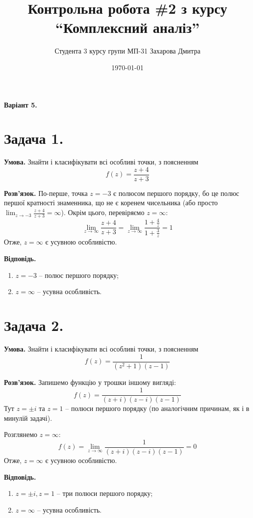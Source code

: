 \documentclass[14pt]{extarticle}
\title{Контрольна робота \#2 з курсу ``Комплексний аналіз''}
\author{Студента 3 курсу групи МП-31 Захарова Дмитра}
\date{\today}
\begin{document}
\maketitle

\begin{center}
    \textbf{Варіант 5.}
\end{center}

\section*{Задача 1.} 

\textbf{Умова.} Знайти і класифікувати всі особливі точки, з поясненням
\[
f(z) = \frac{z+4}{z+3}
\]

\textbf{Розв'язок.} По-перше, точка $z=-3$ є полюсом першого порядку, бо це полюс першої кратності знаменника, що не є коренем чисельника (або просто $\lim_{z \to -3} \frac{z+4}{z+3}=\infty$). Окрім цього, перевіряємо $z=\infty$:
\[
\lim_{z \to \infty} \frac{z+4}{z+3} = \lim_{z \to \infty} \frac{1+\frac{4}{z}}{1+\frac{3}{z}} = 1
\]
Отже, $z = \infty$ є усувною особливістю. 

\textbf{Відповідь.} 

\begin{enumerate}
    \item $z=-3$ -- полюс першого порядку;
    \item $z=\infty$ -- усувна особливість.
\end{enumerate}

\pagebreak

\section*{Задача 2.}
\textbf{Умова.} Знайти і класифікувати всі особливі точки, з поясненням
\[
f(z) = \frac{1}{(z^2+1)(z-1)}
\] 

\textbf{Розв'язок.} Запишемо функцію у трошки іншому вигляді:
\[
f(z) = \frac{1}{(z+i)(z-i)(z-1)}
\]
Тут $z=\pm i$ та $z=1$ -- полюси першого порядку (по аналогічним причинам, як і в минулій задачі). 

Розглянемо $z = \infty$:
\[
f(z) = \lim_{z \to \infty} \frac{1}{(z+i)(z-i)(z-1)} = 0
\]
Отже, $z=\infty$ є усувною особливістю.

\textbf{Відповідь.}
\begin{enumerate}
    \item $z=\pm i, z=1$ -- три полюси першого порядку;
    \item $z=\infty$ -- усувна особливість.
\end{enumerate}
\end{document}
